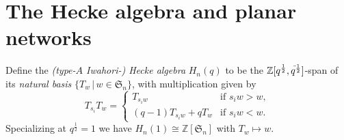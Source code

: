 \documentclass[12pt]{amsart}
\theoremstyle{definition}
\numberwithin{equation}{section}
\newcommand{\sn}{\mathfrak{S}_n}
\newcommand{\zsn}{\mathbb{Z}[\sn]}
\newcommand{\zqq}{\mathbb{Z}[\qp12, \qm12]}
\newcommand{\qp}[2]{q^{\frac{#1}{#2}}}
\newcommand{\qm}[2]{q^{\negthinspace\Bar\,\frac{#1}{#2}}}
\newcommand{\hnq}{H_n(q)}
\newcommand{\inv}{\textsc{inv}}
\newcommand{\ntnsp}{\negthinspace}
\newcommand{\ntksp}{\negthickspace}
\newcommand{\sprod}[2]{s_{#1_1} \ntnsp\cdots s_{#1_#2}}
\begin{document}
\section{The Hecke algebra and planar networks}\label{s:hnqplanar}


Define the {\em (type-$A$ Iwahori-) Hecke algebra} $\hnq$
to be the
$\zqq$-span of its {\em natural basis} $\{ T_w \,|\, w \in \sn \}$,
with multiplication given by
\begin{equation*}
    T_{s_i} T_w = \begin{cases}
        T_{s_i w} &\text{if $s_i w > w$},\\
        (q-1)T_{s_i w} + q T_w &\text{if $s_i w < w$}.
        \end{cases}
\end{equation*}
Specializing at $\qp12 = 1$ we have $H_n(1) \cong \zsn$
with $T_w \mapsto w$.
\end{document}
